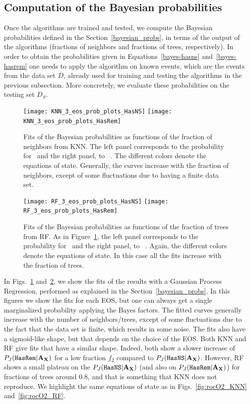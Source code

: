 \subsection{Computation of the Bayesian probabilities}

Once the algorithms are trained and tested, we compute the Bayesian
probabilities defined in the Section~\ref{bayesian_probs}, in terms of the 
output of the algorithms (fractions of neighbors and fractions of trees, 
respectively). In order to obtain the probabilities given in 
Equations~\ref{bayes-hasns} and~\ref{bayes-hasrem} one needs to apply
 the algorithm on known events, which are the events from the data set $D$, already used for training and testing the algorithms in the previous subsection. More concretely, we evaluate these probabilities on the testing set $D_S$.

\begin{figure}%
\texttt{[image: KNN\_3\_eos\_prob\_plots\_HasNS]}
\texttt{[image: KNN\_3\_eos\_prob\_plots\_HasRem]}
\caption{Fits of the Bayesian probabilities as functions of the fraction of neighbors from \ac{KNN}. The left panel corresponds to the probability for \hasns\ and the right panel, to \hasrem\ . The different colors denote the equations of state. Generally, the curves increase with the fraction of neighbors, except of some fluctuations due to having a finite data set.}
\label{fig:bayesian_prob_fits_KNN}
\end{figure}

\begin{figure}%
\texttt{[image: RF\_3\_eos\_prob\_plots\_HasNS]}
\texttt{[image: RF\_3\_eos\_prob\_plots\_HasRem]}
\caption{Fits of the Bayesian probabilities as functions of the fraction of trees from \ac{RF}. As in Figure~\ref{fig:bayesian_prob_fits_KNN}, the left panel corresponds to the probability for \hasns\ and the right panel, to \hasrem\ . Again, the different colors denote the equations of state. In this case all the fits increase with the fraction of trees.}
\label{fig:bayesian_prob_fits_RF}
\end{figure}

In Figs.~\ref{fig:bayesian_prob_fits_KNN} and~\ref{fig:bayesian_prob_fits_RF}, 
we show the fits of  the results with a Gaussian Process Regression,
performed as explained in the Section~\ref{bayesian_probs}. In this figures we show
the fits for each EOS, but one can always get a single marginalized probability
applying the Bayes factors. The fitted curves generally increase with the number of neighbors/trees, except of some fluctuations due to the fact that the data set is finite, which results in some noise. The fits also have a
sigmoid-like shape, but that depends on the choice of the EOS. Both \ac{KNN}
and \ac{RF} give fits that have a similar shape. Indeed, both show a slower
increase of $P_J({{\tt HasRem}} |\bf{A_X})$ for a low fraction $f_2$ compared to $P_J({{\tt HasNS}} |\bf{A_X})$.
However, \ac{RF} shows a small plateau on the $P_J({{\tt HasNS}} |\bf{A_X})$ (and also on
$P_J({{\tt HasRem}} |\bf{A_X})$) for fractions of trees around $0.8$, and that is something that
\ac{KNN} does not reproduce. We highlight the same equations of state as in
Figs.~\ref{fig:rocO2_KNN} and~\ref{fig:rocO2_RF}.

